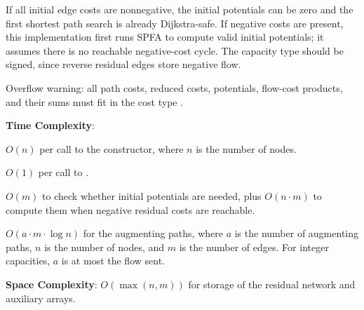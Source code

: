 If all initial edge costs are nonnegative, the initial potentials can be zero and the first shortest path search is already Dijkstra-safe. If negative costs are present, this implementation first runs SPFA to compute valid initial potentials; it assumes there is no reachable negative-cost cycle. The capacity type  should be signed, since reverse residual edges store negative flow.

Overflow warning: all path costs, reduced costs, potentials, flow-cost products, and their sums must fit in the cost type .

\textbf{Time Complexity}:
\begin{compactitem}
  \item $O(n)$ per call to the constructor, where $n$ is the number of nodes.
  \item $O(1)$ per call to .
  \item $O(m)$ to check whether initial potentials are needed, plus $O(n \cdot m)$ to compute them when negative residual costs are reachable.
  \item $O(a \cdot m \cdot \log n)$ for the augmenting paths, where $a$ is the number of augmenting paths, $n$ is the number of nodes, and $m$ is the number of edges. For integer capacities, $a$ is at most the flow sent.
\end{compactitem}

\textbf{Space Complexity}: $O(\max\left(n, m\right))$ for storage of the residual network and auxiliary arrays.

